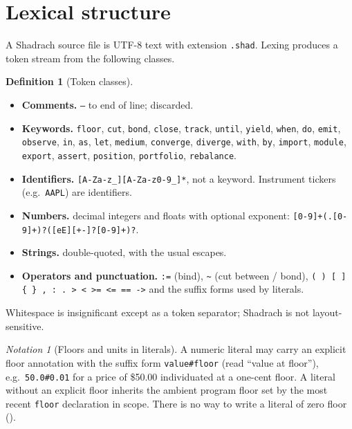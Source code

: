 \documentclass[11pt,a4paper]{article}
\theoremstyle{thmstyle}
\theoremstyle{definition}
\newtheorem{definition}[theorem]{Definition}
\theoremstyle{remark}
\newtheorem{notation}[theorem]{Notation}
\newcommand{\sh}[1]{\texttt{#1}}
\begin{document}
\section{Lexical structure}
\label{sec:lexical}

A Shadrach source file is UTF-8 text with extension \sh{.shad}. Lexing
produces a token stream from the following classes.

\begin{definition}[Token classes]
\label{def:tokens}
\leavevmode
\begin{itemize}[leftmargin=1.4em,itemsep=1pt]
\item \textbf{Comments.} \sh{--} to end of line; discarded.
\item \textbf{Keywords.} \sh{floor}, \sh{cut}, \sh{bond}, \sh{close},
\sh{track}, \sh{until}, \sh{yield}, \sh{when}, \sh{do}, \sh{emit},
\sh{observe}, \sh{in}, \sh{as}, \sh{let}, \sh{medium}, \sh{converge},
\sh{diverge}, \sh{with}, \sh{by}, \sh{import}, \sh{module}, \sh{export},
\sh{assert}, \sh{position}, \sh{portfolio}, \sh{rebalance}.
\item \textbf{Identifiers.} \sh{[A-Za-z\_][A-Za-z0-9\_]*}, not a
keyword. Instrument tickers (e.g.\ \sh{AAPL}) are identifiers.
\item \textbf{Numbers.} decimal integers and floats with optional
exponent: \sh{[0-9]+(.[0-9]+)?([eE][+-]?[0-9]+)?}.
\item \textbf{Strings.} double-quoted, with the usual escapes.
\item \textbf{Operators and punctuation.} \sh{:=} (bind), \sh{\~{}}
(cut between / bond), \sh{( ) [ ] \{ \} , : . > < >= <= == ->} and the
suffix forms used by literals.
\end{itemize}
Whitespace is insignificant except as a token separator; Shadrach is not
layout-sensitive.
\end{definition}

\begin{notation}[Floors and units in literals]
\label{not:literals}
A numeric literal may carry an explicit floor annotation with the
suffix form \sh{value\#floor} (read ``value at floor''), e.g.\
\sh{50.0\#0.01} for a price of \$50.00 individuated at a one-cent floor.
A literal without an explicit floor inherits the ambient program floor
set by the most recent \sh{floor} declaration in scope. There is no way
to write a literal of zero floor (\Cref{thm:no-zero-value}).
\end{notation}
\end{document}
